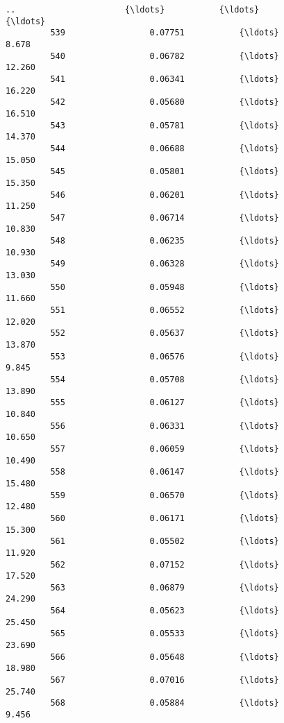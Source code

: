 \documentclass[11pt]{article}
\begin{document}
\begin{Verbatim}[commandchars=\\\{\}]
         ..                      {\ldots}           {\ldots}                      {\ldots}   
         539                 0.07751           {\ldots}                    8.678   
         540                 0.06782           {\ldots}                   12.260   
         541                 0.06341           {\ldots}                   16.220   
         542                 0.05680           {\ldots}                   16.510   
         543                 0.05781           {\ldots}                   14.370   
         544                 0.06688           {\ldots}                   15.050   
         545                 0.05801           {\ldots}                   15.350   
         546                 0.06201           {\ldots}                   11.250   
         547                 0.06714           {\ldots}                   10.830   
         548                 0.06235           {\ldots}                   10.930   
         549                 0.06328           {\ldots}                   13.030   
         550                 0.05948           {\ldots}                   11.660   
         551                 0.06552           {\ldots}                   12.020   
         552                 0.05637           {\ldots}                   13.870   
         553                 0.06576           {\ldots}                    9.845   
         554                 0.05708           {\ldots}                   13.890   
         555                 0.06127           {\ldots}                   10.840   
         556                 0.06331           {\ldots}                   10.650   
         557                 0.06059           {\ldots}                   10.490   
         558                 0.06147           {\ldots}                   15.480   
         559                 0.06570           {\ldots}                   12.480   
         560                 0.06171           {\ldots}                   15.300   
         561                 0.05502           {\ldots}                   11.920   
         562                 0.07152           {\ldots}                   17.520   
         563                 0.06879           {\ldots}                   24.290   
         564                 0.05623           {\ldots}                   25.450   
         565                 0.05533           {\ldots}                   23.690   
         566                 0.05648           {\ldots}                   18.980   
         567                 0.07016           {\ldots}                   25.740   
         568                 0.05884           {\ldots}                    9.456   
         

\end{Verbatim}
\end{document}
